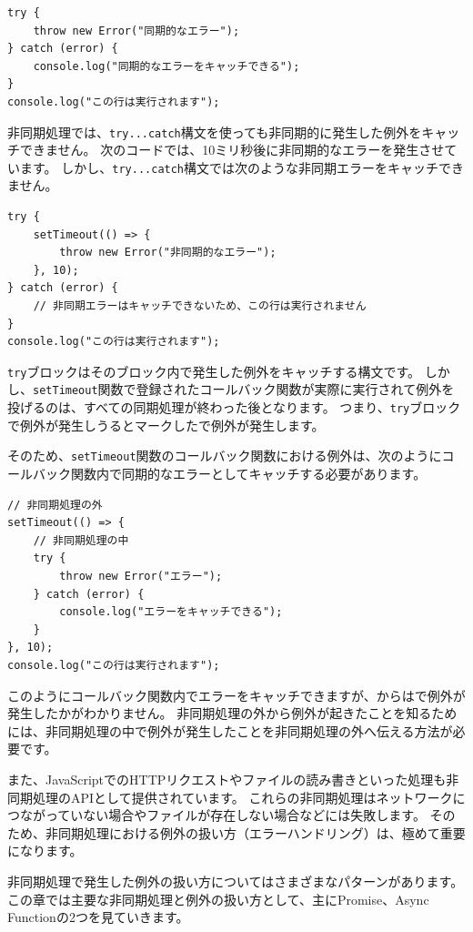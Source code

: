 \begin{lstlisting}
try {
    throw new Error("同期的なエラー");
} catch (error) {
    console.log("同期的なエラーをキャッチできる");
}
console.log("この行は実行されます");
\end{lstlisting}

非同期処理では、\texttt{try...catch}構文を使っても非同期的に発生した例外をキャッチできません。
次のコードでは、10ミリ秒後に非同期的なエラーを発生させています。
しかし、\texttt{try...catch}構文では次のような非同期エラーをキャッチできません。

\begin{lstlisting}
try {
    setTimeout(() => {
        throw new Error("非同期的なエラー");
    }, 10);
} catch (error) {
    // 非同期エラーはキャッチできないため、この行は実行されません
}
console.log("この行は実行されます");
\end{lstlisting}

\texttt{try}ブロックはそのブロック内で発生した例外をキャッチする構文です。
しかし、\texttt{setTimeout}関数で登録されたコールバック関数が実際に実行されて例外を投げるのは、すべての同期処理が終わった後となります。
つまり、\texttt{try}ブロックで例外が発生しうるとマークした\textbf{}で例外が発生します。

そのため、\texttt{setTimeout}関数のコールバック関数における例外は、次のようにコールバック関数内で同期的なエラーとしてキャッチする必要があります。

\begin{lstlisting}
// 非同期処理の外
setTimeout(() => {
    // 非同期処理の中
    try {
        throw new Error("エラー");
    } catch (error) {
        console.log("エラーをキャッチできる");
    }
}, 10);
console.log("この行は実行されます");
\end{lstlisting}

このようにコールバック関数内でエラーをキャッチできますが、\textbf{}からは\textbf{}で例外が発生したかがわかりません。
非同期処理の外から例外が起きたことを知るためには、非同期処理の中で例外が発生したことを非同期処理の外へ伝える方法が必要です。

また、JavaScriptでのHTTPリクエストやファイルの読み書きといった処理も非同期処理のAPIとして提供されています。
これらの非同期処理はネットワークにつながっていない場合やファイルが存在しない場合などには失敗します。
そのため、非同期処理における例外の扱い方（エラーハンドリング）は、極めて重要になります。

非同期処理で発生した例外の扱い方についてはさまざまなパターンがあります。
この章では主要な非同期処理と例外の扱い方として、主にPromise、Async Functionの2つを見ていきます。

